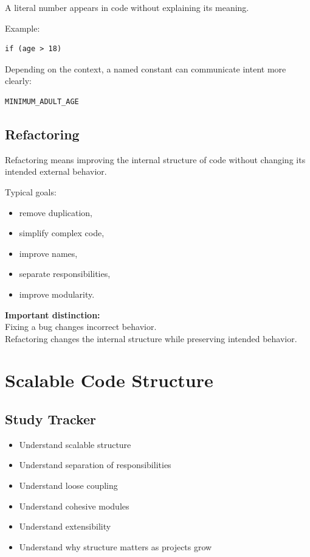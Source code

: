 \documentclass[11pt,a4paper]{article}
\newcommand{\checkitem}{$\square$}
\begin{document}
A literal number appears in code without explaining its meaning.

Example:

\begin{verbatim}
if (age > 18)
\end{verbatim}

Depending on the context, a named constant can communicate intent more clearly:

\begin{verbatim}
MINIMUM_ADULT_AGE
\end{verbatim}

\subsection{Refactoring}

Refactoring means improving the internal structure of code without changing
its intended external behavior.

Typical goals:

\begin{itemize}
    \item remove duplication,
    \item simplify complex code,
    \item improve names,
    \item separate responsibilities,
    \item improve modularity.
\end{itemize}

\begin{exambox}
\textbf{Important distinction:}\\
Fixing a bug changes incorrect behavior.\\
Refactoring changes the internal structure while preserving intended behavior.
\end{exambox}

\section{Scalable Code Structure}

\subsection{Study Tracker}

\begin{itemize}[label=\checkitem]
    \item Understand scalable structure
    \item Understand separation of responsibilities
    \item Understand loose coupling
    \item Understand cohesive modules
    \item Understand extensibility
    \item Understand why structure matters as projects grow
\end{itemize}
\end{document}
